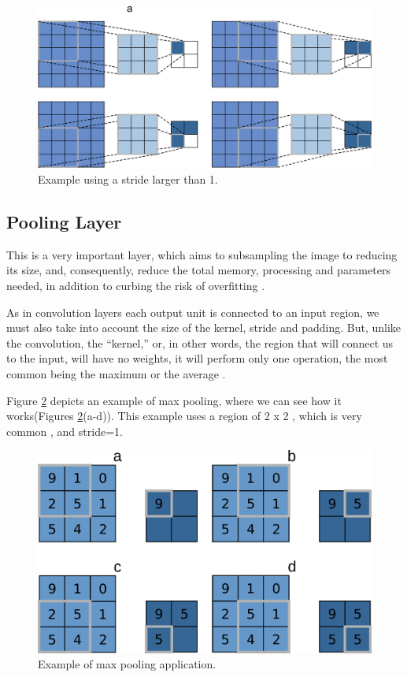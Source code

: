 \begin{figure}
    \centering
    \includegraphics[scale=0.20]{Part 3 - Learning Systems/Supervised Learning/Deep Learning/images/stride.png}
    \caption{Example using a stride larger than 1.}
    \label{fig:stride}
\end{figure}

\subsection{Pooling Layer}

This is a very important layer, which aims to subsampling the image to reducing its size, and, consequently, reduce the total memory, processing and parameters needed, in addition to curbing the risk of overfitting \cite{geron2019}\cite{adrian2017}\cite{elgendy2020}.

As in convolution layers each output unit is connected to an input region, we must also take into account the size of the kernel, stride and padding. But, unlike the convolution, the “kernel,” or, in other words, the region that will connect us to the input, will have no weights, it will perform only one operation, the most common being the maximum or the average \cite{geron2019} .

Figure \ref{fig:figure121} depicts an example of max pooling, where we can see how it works(Figures \ref{fig:figure121}(a-d)). This example uses a region of 2 x 2 , which is very common \cite{adrian2017}, and stride=1.

\begin{figure}
    \centering
    \includegraphics[scale=0.30]{Part 3 - Learning Systems/Supervised Learning/Deep Learning/images/figure121.png}
    \caption{Example of max pooling application.}
    \label{fig:figure121}
\end{figure}

